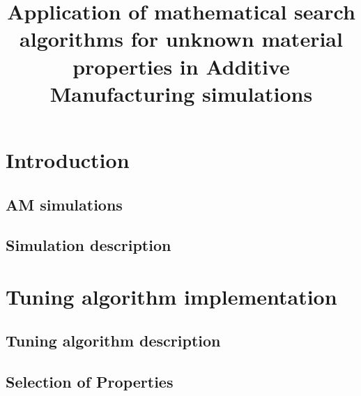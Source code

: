 \documentclass[pdflatex,sn-basic]{sn-jnl}
\begin{document}
\title[Searching for unknown material properties for AM simulations]{Application of mathematical search algorithms for unknown material properties in Additive Manufacturing simulations}


\author[1]{ }
\author[1]{ }


\abstract{
	
	}



\maketitle

\section{Introduction}
	\subsection{\Acf{AM} simulations}
	


	\subsection{Simulation description}
	

\section{Tuning algorithm implementation}
	
	\subsection{Tuning algorithm description}
	

	\subsection{Selection of Properties}
	
\end{document}
